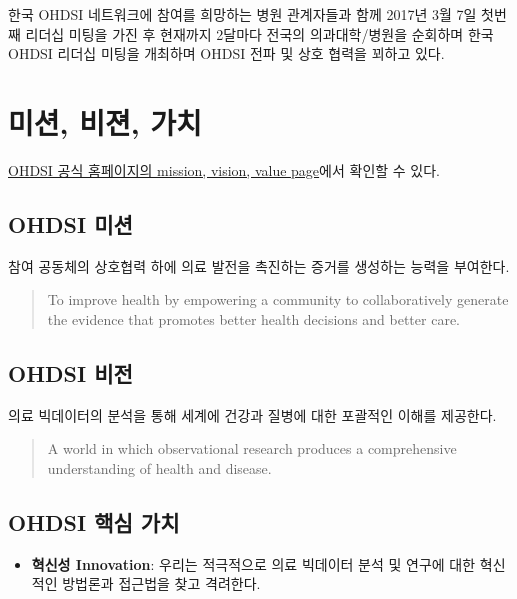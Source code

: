 \documentclass[]{book}
\providecommand{\tightlist}{%
  \setlength{\itemsep}{0pt}\setlength{\parskip}{0pt}}
\begin{document}
한국 OHDSI 네트워크에 참여를 희망하는 병원 관계자들과 함께 2017년 3월 7일 첫번째 리더십 미팅을 가진 후 현재까지 2달마다 전국의 의과대학/병원을 순회하며 한국 OHDSI 리더십 미팅을 개최하며 OHDSI 전파 및 상호 협력을 꾀하고 있다.

\hypertarget{MissionVissionValues}{%
\section{미션, 비젼, 가치}\label{MissionVissionValues}}

\href{https://www.ohdsi.org/who-we-are/mission-vision-values/}{OHDSI 공식 홈페이지의 mission, vision, value page}에서 확인할 수 있다.

\hypertarget{ohdsi--1}{%
\subsection{OHDSI 미션}\label{ohdsi--1}}

참여 공동체의 상호협력 하에 의료 발전을 촉진하는 증거를 생성하는 능력을 부여한다.

\begin{quote}
To improve health by empowering a community to collaboratively generate the evidence that promotes better health decisions and better care.
\end{quote}

\hypertarget{ohdsi--2}{%
\subsection{OHDSI 비전}\label{ohdsi--2}}

의료 빅데이터의 분석을 통해 세계에 건강과 질병에 대한 포괄적인 이해를 제공한다.

\begin{quote}
A world in which observational research produces a comprehensive understanding of health and disease.
\end{quote}

\hypertarget{ohdsi--}{%
\subsection{OHDSI 핵심 가치}\label{ohdsi--}}

\begin{itemize}
\tightlist
\item
  \textbf{혁신성 Innovation}: 우리는 적극적으로 의료 빅데이터 분석 및 연구에 대한 혁신적인 방법론과 접근법을 찾고 격려한다.
\end{itemize}
\end{document}
